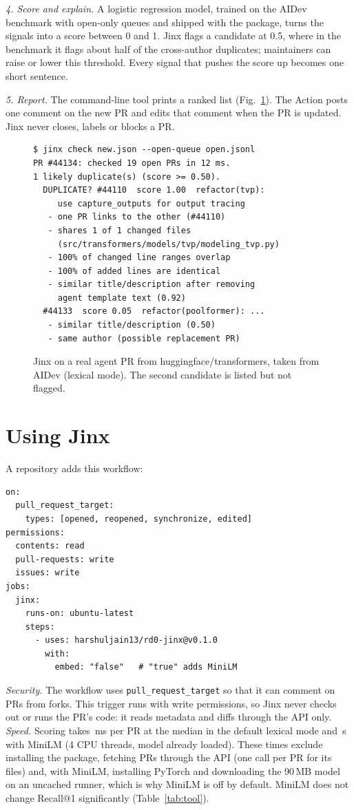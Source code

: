 \documentclass[sigconf]{acmart}
\begin{document}
\emph{4. Score and explain.} A logistic regression model, trained on the AIDev benchmark with open-only queues and shipped with the package, turns the signals into a score between 0 and 1. Jinx flags a candidate at 0.5, where in the benchmark it flags about half of the cross-author duplicates; maintainers can raise or lower this threshold. Every signal that pushes the score up becomes one short sentence.

\emph{5. Report.} The command-line tool prints a ranked list (Fig.~\ref{fig:cli}). The Action posts one comment on the new PR and edits that comment when the PR is updated. Jinx never closes, labels or blocks a PR.

\begin{figure}[t]
\small
\begin{verbatim}
$ jinx check new.json --open-queue open.jsonl
PR #44134: checked 19 open PRs in 12 ms.
1 likely duplicate(s) (score >= 0.50).
  DUPLICATE? #44110  score 1.00  refactor(tvp):
     use capture_outputs for output tracing
   - one PR links to the other (#44110)
   - shares 1 of 1 changed files
     (src/transformers/models/tvp/modeling_tvp.py)
   - 100% of changed line ranges overlap
   - 100% of added lines are identical
   - similar title/description after removing
     agent template text (0.92)
  #44133  score 0.05  refactor(poolformer): ...
   - similar title/description (0.50)
   - same author (possible replacement PR)
\end{verbatim}
\caption{Jinx on a real agent PR from huggingface/transformers, taken from AIDev (lexical mode). The second candidate is listed but not flagged.}\label{fig:cli}\end{figure}

\section{Using Jinx}
A repository adds this workflow:
\begin{verbatim}
on:
  pull_request_target:
    types: [opened, reopened, synchronize, edited]
permissions:
  contents: read
  pull-requests: write
  issues: write
jobs:
  jinx:
    runs-on: ubuntu-latest
    steps:
      - uses: harshuljain13/rd0-jinx@v0.1.0
        with:
          embed: "false"   # "true" adds MiniLM
\end{verbatim}
\emph{Security.} The workflow uses \texttt{pull\_request\_target} so that it can comment on PRs from forks. This trigger runs with write permissions, so Jinx never checks out or runs the PR's code: it reads metadata and diffs through the API only. \emph{Speed.} Scoring takes \latJinx\,ms per PR at the median in the default lexical mode and \latMini\,s with MiniLM (4 CPU threads, model already loaded). These times exclude installing the package, fetching PRs through the API (one call per PR for its files) and, with MiniLM, installing PyTorch and downloading the 90\,MB model on an uncached runner, which is why MiniLM is off by default. MiniLM does not change Recall@1 significantly (Table~\ref{tab:tool}).
\end{document}
